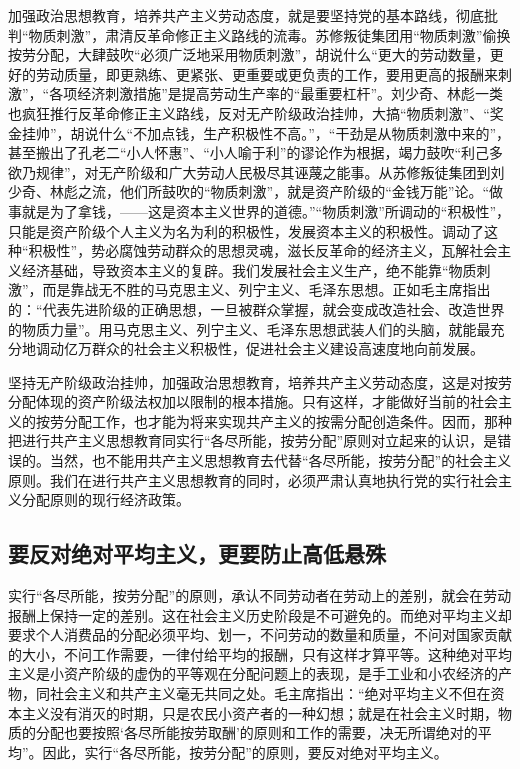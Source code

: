 \documentclass{book}
\begin{document}
加强政治思想教育，培养共产主义劳动态度，就是要坚持党的基本路线，彻底批判“物质刺激”，肃清反革命修正主义路线的流毒。苏修叛徒集团用“物质刺激”偷换按劳分配，大肆鼓吹“必须广泛地采用物质刺激”，胡说什么“更大的劳动数量，更好的劳动质量，即更熟练、更紧张、更重要或更负责的工作，要用更高的报酬来刺激”，“各项经济刺激措施”是提高劳动生产率的“最重要杠杆”。刘少奇、林彪一类也疯狂推行反革命修正主义路线，反对无产阶级政治挂帅，大搞“物质刺激”、“奖金挂帅”，胡说什么“不加点钱，生产积极性不高。”，“干劲是从物质刺激中来的”，甚至搬出了孔老二“小人怀惠”、“小人喻于利”的谬论作为根据，竭力鼓吹“利己多欲乃规律”，对无产阶级和广大劳动人民极尽其诬蔑之能事。从苏修叛徒集团到刘少奇、林彪之流，他们所鼓吹的“物质刺激”，就是资产阶级的“金钱万能”论。“做事就是为了拿钱，——这是资本主义世界的道德。”“物质刺激”所调动的“积极性”，只能是资产阶级个人主义为名为利的积极性，发展资本主义的积极性。调动了这种“积极性”，势必腐蚀劳动群众的思想灵魂，滋长反革命的经济主义，瓦解社会主义经济基础，导致资本主义的复辟。我们发展社会主义生产，绝不能靠“物质刺激”，而是靠战无不胜的马克思主义、列宁主义、毛泽东思想。正如毛主席指出的：“代表先进阶级的正确思想，一旦被群众掌握，就会变成改造社会、改造世界的物质力量”。用马克思主义、列宁主义、毛泽东思想武装人们的头脑，就能最充分地调动亿万群众的社会主义积极性，促进社会主义建设高速度地向前发展。

坚持无产阶级政治挂帅，加强政治思想教育，培养共产主义劳动态度，这是对按劳分配体现的资产阶级法权加以限制的根本措施。只有这样，才能做好当前的社会主义的按劳分配工作，也才能为将来实现共产主义的按需分配创造条件。因而，那种把进行共产主义思想教育同实行“各尽所能，按劳分配”原则对立起来的认识，是错误的。当然，也不能用共产主义思想教育去代替“各尽所能，按劳分配”的社会主义原则。我们在进行共产主义思想教育的同时，必须严肃认真地执行党的实行社会主义分配原则的现行经济政策。

\subsection{要反对绝对平均主义，更要防止高低悬殊}

实行“各尽所能，按劳分配”的原则，承认不同劳动者在劳动上的差别，就会在劳动报酬上保持一定的差别。这在社会主义历史阶段是不可避免的。而绝对平均主义却要求个人消费品的分配必须平均、划一，不问劳动的数量和质量，不问对国家贡献的大小，不问工作需要，一律付给平均的报酬，只有这样才算平等。这种绝对平均主义是小资产阶级的虚伪的平等观在分配问题上的表现，是手工业和小农经济的产物，同社会主义和共产主义毫无共同之处。毛主席指出：“绝对平均主义不但在资本主义没有消灭的时期，只是农民小资产者的一种幻想；就是在社会主义时期，物质的分配也要按照‘各尽所能按劳取酬’的原则和工作的需要，决无所谓绝对的平均”。因此，实行“各尽所能，按劳分配”的原则，要反对绝对平均主义。
\end{document}
